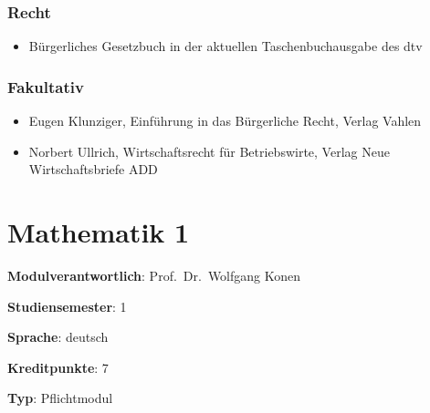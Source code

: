 \hypertarget{rechtpathlabelmi-2017modulbeschreibungen-bachelorba_mug-1}{%
\subsection*{Recht\label{/mi-2017/modulbeschreibungen-bachelor/BA_MUG}}\label{rechtpathlabelmi-2017modulbeschreibungen-bachelorba_mug-1}}

\begin{itemize}
\tightlist
\item
  Bürgerliches Gesetzbuch in der aktuellen Taschenbuchausgabe des dtv
\end{itemize}

\hypertarget{fakultativpathlabelmi-2017modulbeschreibungen-bachelorba_mug}{%
\subsection*{Fakultativ\label{/mi-2017/modulbeschreibungen-bachelor/BA_MUG}}\label{fakultativpathlabelmi-2017modulbeschreibungen-bachelorba_mug}}

\begin{itemize}
\tightlist
\item
  Eugen Klunziger, Einführung in das Bürgerliche Recht, Verlag Vahlen
\item
  Norbert Ullrich, Wirtschaftsrecht für Betriebswirte, Verlag Neue
  Wirtschaftsbriefe ADD
\end{itemize}

\hypertarget{mathematik-1pathlabelmi-2017modulbeschreibungen-bachelorba_mathematik1}{%
\chapter{Mathematik
1\label{/mi-2017/modulbeschreibungen-bachelor/BA_Mathematik1}}\label{mathematik-1pathlabelmi-2017modulbeschreibungen-bachelorba_mathematik1}}

\begin{modulHead}
\textbf{Modulverantwortlich}: Prof.~Dr.~Wolfgang
Konen
\end{modulHead}
\begin{modulHead}
\textbf{Studiensemester}:
1
\end{modulHead}
\begin{modulHead}
\textbf{Sprache}:
deutsch
\end{modulHead}
\begin{modulHead}
\textbf{Kreditpunkte}:
7
\end{modulHead}
\begin{modulHead}
\textbf{Typ}:
Pflichtmodul
\end{modulHead}



